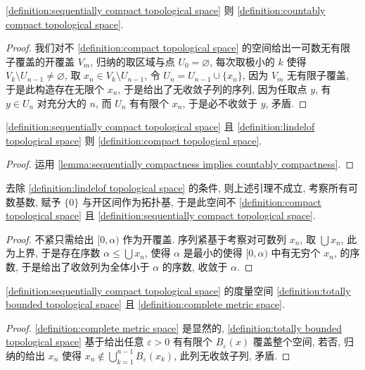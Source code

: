 \begin{lemma}
    \label {lemma:sequentially compactness implies countably compactness}
    \ref{definition:sequentially compact topological space} 则 \ref{definition:countably compact topological space}.

    \begin{proof}
        我们对不 \ref{definition:compact topological space} 的空间给出一可数无有限子覆盖的开覆盖 \(V_m\),
        归纳的取区域与点 \(U_0 = \varnothing\), 每次取极小的 \(k\) 使得 \(V_k \setminus U_{n-1} \neq \varnothing\), 取 \(x_n \in V_k \setminus U_{n-1}\),
        令 \(U_n = U_{n-1} \cup \{x_n\}\), 因为 \(V_m\) 无有限子覆盖, 于是此构造存在无限个 \(x_n\), 于是给出了无收敛子列的序列, 因为任取点 \(y\), 
        有 \(y \in U_n\) 对充分大的 \(n\), 而 \(U_n\) 有有限个 \(x_n\), 于是必不收敛于 \(y\), 矛盾.
    \end{proof}
\end{lemma}

\begin{corollary}
    \ref{definition:sequentially compact topological space} 且 \ref{definition:lindelof topological space} 则 \ref{definition:compact topological space}.

    \begin{proof}
        运用 \ref{lemma:sequentially compactness implies countably compactness}.
    \end{proof}
\end{corollary}

\begin{example}
    去除 \ref{definition:lindelof topological space} 的条件, 则上述引理不成立,
    考察所有可数基数, 赋予 \(\{0\}\) 与开区间作为拓扑基, 于是此空间不 \ref{definition:compact topological space} 且 \ref{definition:sequentially compact topological space}.

    \begin{proof}
        不紧只需给出 \([0,\alpha)\) 作为开覆盖. 序列紧基于考察对可数列 \(x_n\), 取 \(\bigcup x_n\),
        此为上界, 于是存在序数 \(\alpha \le \bigcup x_n\), 使得 \(\alpha\) 是最小的使得 \([0,\alpha)\) 中有无穷个 \(x_n\),
        的序数, 于是给出了收敛列为全体小于 \(\alpha\) 的序数, 收敛于 \(\alpha\).
    \end{proof}
\end{example}

\begin{lemma}
    \ref{definition:sequentially compact topological space} 的度量空间 \ref{definition:totally bounded topological space} 且 \ref{definition:complete metric space}.

    \begin{proof}
        \ref{definition:complete metric space} 是显然的, \ref{definition:totally bounded topological space} 基于给出任意 \(\varepsilon > 0\) 有有限个 \(B_\varepsilon (x)\) 覆盖整个空间,
        若否, 归纳的给出 \(x_n\) 使得 \(x_n \notin \bigcup_{k = 1}^{n-1} B_{\varepsilon} (x_k)\), 此列无收敛子列, 矛盾.
    \end{proof}
\end{lemma}

